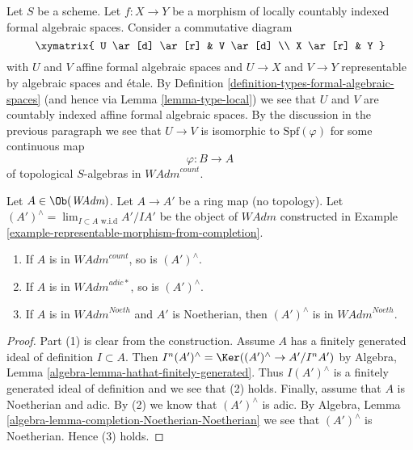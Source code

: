 \medskip\noindent
Let $S$ be a scheme. Let $f : X \to Y$ be a morphism of
locally countably indexed formal algebraic spaces. Consider a
commutative diagram
$$
\xymatrix{
U \ar[d] \ar[r] & V \ar[d] \\
X \ar[r] & Y
}
$$
with $U$ and $V$ affine formal algebraic spaces and $U \to X$ and $V \to Y$
representable by algebraic spaces and \'etale. By
Definition \ref{definition-types-formal-algebraic-spaces} (and hence via
Lemma \ref{lemma-type-local}) we see that $U$ and $V$ are countably indexed
affine formal algebraic spaces. By the discussion in the previous
paragraph we see that $U \to V$ is isomorphic to $\text{Spf}(\varphi)$
for some continuous map
$$
\varphi : B \longrightarrow A
$$
of topological $S$-algebras in $\textit{WAdm}^{count}$.

\begin{lemma}
\label{lemma-completion-in-sub}
Let $A \in \Ob(\textit{WAdm})$. Let $A \to A'$ be a ring
map (no topology). Let $(A')^\wedge = \lim_{I \subset A\text{ w.i.d}} A'/IA'$
be the object of $\textit{WAdm}$ constructed in
Example \ref{example-representable-morphism-from-completion}.
\begin{enumerate}
\item If $A$ is in $\textit{WAdm}^{count}$, so is $(A')^\wedge$.
\item If $A$ is in $\textit{WAdm}^{adic*}$, so is $(A')^\wedge$.
\item If $A$ is in $\textit{WAdm}^{Noeth}$ and $A'$ is Noetherian, then
$(A')^\wedge$ is in $\textit{WAdm}^{Noeth}$.
\end{enumerate}
\end{lemma}

\begin{proof}
Part (1) is clear from the construction.
Assume $A$ has a finitely generated ideal of definition $I \subset A$.
Then $I^n(A')^\wedge =  \Ker((A')^\wedge \to A'/I^nA')$ by Algebra, Lemma
\ref{algebra-lemma-hathat-finitely-generated}.
Thus $I(A')^\wedge$ is a finitely generated ideal of definition
and we see that (2) holds.
Finally, assume that $A$ is Noetherian and adic.
By (2) we know that $(A')^\wedge$ is adic.
By Algebra, Lemma \ref{algebra-lemma-completion-Noetherian-Noetherian}
we see that $(A')^\wedge$ is Noetherian. Hence (3) holds.
\end{proof}

